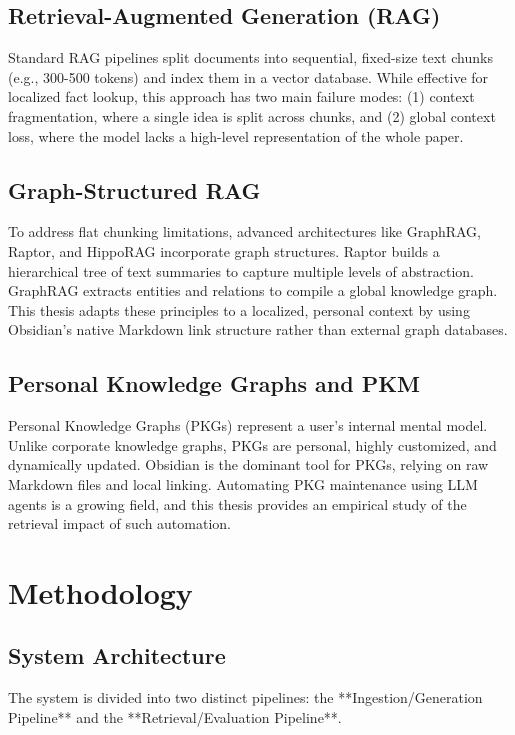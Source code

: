 \documentclass[11pt, a4paper, oneside]{article}
\begin{document}
\subsection{Retrieval-Augmented Generation (RAG)}
Standard RAG pipelines split documents into sequential, fixed-size text chunks (e.g., 300-500 tokens) and index them in a vector database. While effective for localized fact lookup, this approach has two main failure modes: (1) context fragmentation, where a single idea is split across chunks, and (2) global context loss, where the model lacks a high-level representation of the whole paper. 

\subsection{Graph-Structured RAG}
To address flat chunking limitations, advanced architectures like GraphRAG, Raptor, and HippoRAG incorporate graph structures. Raptor builds a hierarchical tree of text summaries to capture multiple levels of abstraction. GraphRAG extracts entities and relations to compile a global knowledge graph. This thesis adapts these principles to a localized, personal context by using Obsidian’s native Markdown link structure rather than external graph databases.

\subsection{Personal Knowledge Graphs and PKM}
Personal Knowledge Graphs (PKGs) represent a user’s internal mental model. Unlike corporate knowledge graphs, PKGs are personal, highly customized, and dynamically updated. Obsidian is the dominant tool for PKGs, relying on raw Markdown files and local linking. Automating PKG maintenance using LLM agents is a growing field, and this thesis provides an empirical study of the retrieval impact of such automation.

\section{Methodology}
\label{sec:methodology}

\subsection{System Architecture}
The system is divided into two distinct pipelines: the **Ingestion/Generation Pipeline** and the **Retrieval/Evaluation Pipeline**.
\end{document}
